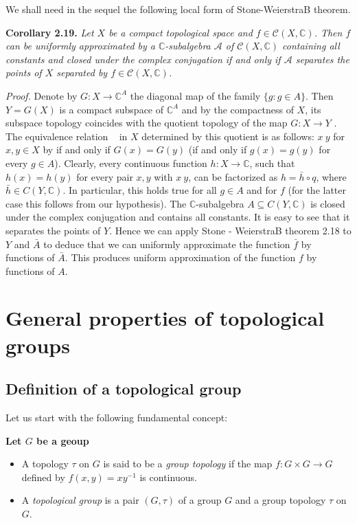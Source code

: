 \documentclass[12pt]{article}
\begin{document}
    We shall need in the sequel the following local form of Stone-WeierstraB theorem.


\textbf{Corollary 2.19.} \emph{Let $ X $ be a compact topological space and $ f \in \mathcal{C}(X, \mathbb{C}) $. Then $ f $ can be uniformly approximated
by a $ \mathbb{C} $-subalgebra $ \mathcal{A} $ of $ \mathcal{C}(X, \mathbb{C}) $ containing all constants and closed under the complex conjugation if and only
if $ \mathcal{A} $ separates the points of $ X $ separated by $ f \in \mathcal{C}(X, \mathbb{C}) $.}


\emph{Proof.} Denote by $ G : X \to \mathbb{C}^A $ the diagonal map of the family $\{g : g \in A\}$. Then $ Y = G(X) $ is a compact
subspace of $ \mathbb{C}^A $ and by the compactness of $ X $, its subspace topology coincides with the quotient topology of
the map $ G : X \to Y $ . The equivalence relation ~ in $ X $ determined by this quotient is as follows: $ x ~ y $ for
$ x, y \in X $ by if and only if $ G(x) = G(y) $ (if and only if $ g(x) = g(y) $ for every $ g \in A $). Clearly, every continuous
function $ h : X \to \mathbb{C} $, such that $ h(x) = h(y) $ for every pair $ x, y $ with $ x ~ y $, can be factorized as $ h = \bar{h} \circ q $, where
$\bar{h} \in C(Y, \mathbb{C})$. In particular, this holds true for all $ g \in A $ and for $ f $ (for the latter case this follows from our
hypothesis). The $\mathbb{C}$-subalgebra $ A \subseteq C(Y, \mathbb{C}) $ is closed under the complex conjugation and contains all constants.
It is easy to see that it separates the points of $ Y $. Hence we can apply Stone - WeierstraB theorem 2.18 to $ Y $
and $ \bar{A} $ to deduce that we can uniformly approximate the function $ \bar{f} $ by functions of $ \bar{A} $. This produces uniform
approximation of the function $ f $ by functions of $ A $.



\section{General properties of topological groups}


\subsection{Definition of a topological group}


Let us start with the following fundamental concept:


\textbf{Let $ G $ be a geoup}
    

    \begin{itemize}

        \item A topology $\tau$ on $ G $ is said to be a \emph{group topology} if the map $ f : G \times G \to G $ defined by $f(x, y) = xy^{-1}$
        is continuous.

        \item A \emph{topological group} is a pair $ (G, \tau) $ of a group $ G $ and a group topology $\tau$ on $ G $.
    \end{itemize}
    
\end{document}
